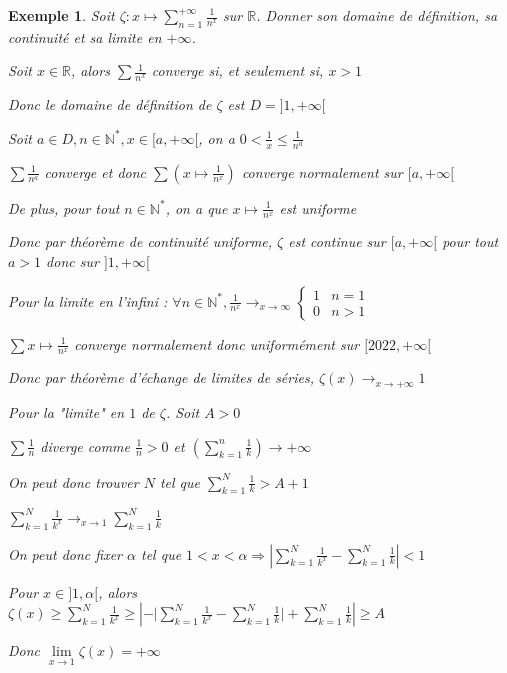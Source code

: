 \documentclass[a4paper,12pt]{book}
\newtheorem{Exe}{Exemple}[section]
\def\R{\mathbb{R}}
\def\N{\mathbb{N}}
\begin{document}
\begin{Exe}
Soit $\zeta:x\mapsto \sum\limits_{n=1}^{+\infty}\frac{1}{n^x}$ sur $\R$. Donner son domaine de définition, sa continuité et sa limite en $+\infty$. \par Soit $x\in\R$, alors $\sum\frac{1}{n^x}$ converge si, et seulement si, $x>1$ \par Donc le domaine de définition de $\zeta$ est $D=]1,+\infty[$ \par Soit $a\in D, n\in\N^*, x\in[a, +\infty[$, on a $0<\frac{1}{x}\leq\frac{1}{n^a}$ \par $\sum\frac{1}{n^a}$ converge et donc $\sum\left(x\mapsto\frac{1}{n^x}\right)$ converge normalement sur $[a,+\infty[$
\par De plus, pour tout $n\in\N^*$, on a que $x\mapsto\frac{1}{n^x}$ est uniforme \par Donc par théorème de continuité uniforme, $\zeta$ est continue sur $[a,+\infty[$ pour tout $a>1$ donc sur $]1,+\infty[$ \par Pour la limite en l'infini : $\forall n\in\N^*, \frac{1}{n^x}\to_{x\to\infty} \left\{\begin{array}{rc} 1 & n=1 \\ 0 & n>1\end{array}\right.$ \par $\sum x\mapsto\frac{1}{n^x}$ converge normalement donc uniformément sur $[2022,+\infty[$ \par Donc par théorème d'échange de limites de séries, $\zeta(x)\to_{x\to+\infty}1$ \par Pour la "limite" en $1$ de $\zeta$. Soit $A>0$ \par $\sum\frac{1}{n}$ diverge comme $\frac{1}{n}>0$ et $\left(\sum\limits_{k=1}^n\frac{1}{k}\right)\to+\infty$
\par On peut donc trouver $N$ tel que $\sum\limits_{k=1}^N\frac{1}{k}>A+1$ \par $\sum\limits_{k=1}^N\frac{1}{k^x}\to_{x\to 1}\sum\limits_{k=1}^N\frac{1}{k}$ \par On peut donc fixer $\alpha$ tel que $1<x<\alpha\Rightarrow \left|\sum\limits_{k=1}^N\frac{1}{k^x}-\sum\limits_{k=1}^N\frac{1}{k}\right|<1$ \par Pour $x\in]1,\alpha[$, alors $\zeta(x)\geq \sum\limits_{k=1}^N\frac{1}{k^x}\geq \left|-\vert\sum\limits_{k=1}^N\frac{1}{k^x}-\sum\limits_{k=1}^N\frac{1}{k}\vert + \sum\limits_{k=1}^N\frac{1}{k}\right|\geq A$ \par Donc $\lim\limits_{x\to 1}\zeta(x)=+\infty$
\end{Exe}
\end{document}
